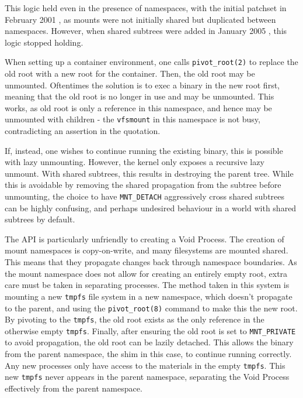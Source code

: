 \documentclass[sigplan]{acmart}
\begin{document}

This logic held even in the presence of namespaces, with the initial patchset in February 2001 \citep{viro_patch_2001}, as mounts were not initially shared but duplicated between namespaces. However, when shared subtrees were added in January 2005 \citep{viro_rfc_2005}, this logic stopped holding.

When setting up a container environment, one calls \texttt{pivot\_root(2)} to replace the old root with a new root for the container. Then, the old root may be unmounted. Oftentimes the solution is to exec a binary in the new root first, meaning that the old root is no longer in use and may be unmounted. This works, as old root is only a reference in this namespace, and hence may be unmounted with children - the \texttt{vfsmount} in this namespace is not busy, contradicting an assertion in the quotation.

If, instead, one wishes to continue running the existing binary, this is possible with lazy unmounting. However, the kernel only exposes a recursive lazy unmount. With shared subtrees, this results in destroying the parent tree. While this is avoidable by removing the shared propagation from the subtree before unmounting, the choice to have \texttt{MNT\_DETACH} aggressively cross shared subtrees can be highly confusing, and perhaps undesired behaviour in a world with shared subtrees by default.

The API is particularly unfriendly to creating a Void Process. The creation of mount namespaces is copy-on-write, and many filesystems are mounted shared. This means that they propagate changes back through namespace boundaries. As the mount namespace does not allow for creating an entirely empty root, extra care must be taken in separating processes. The method taken in this system is mounting a new \texttt{tmpfs} file system in a new namespace, which doesn't propagate to the parent, and using the \texttt{pivot\_root(8)} command to make this the new root. By pivoting to the \texttt{tmpfs}, the old root exists as the only reference in the otherwise empty \texttt{tmpfs}. Finally, after ensuring the old root is set to \texttt{MNT\_PRIVATE} to avoid propagation, the old root can be lazily detached. This allows the binary from the parent namespace, the shim in this case, to continue running correctly. Any new processes only have access to the materials in the empty \texttt{tmpfs}. This new \texttt{tmpfs} never appears in the parent namespace, separating the Void Process effectively from the parent namespace.
\end{document}
